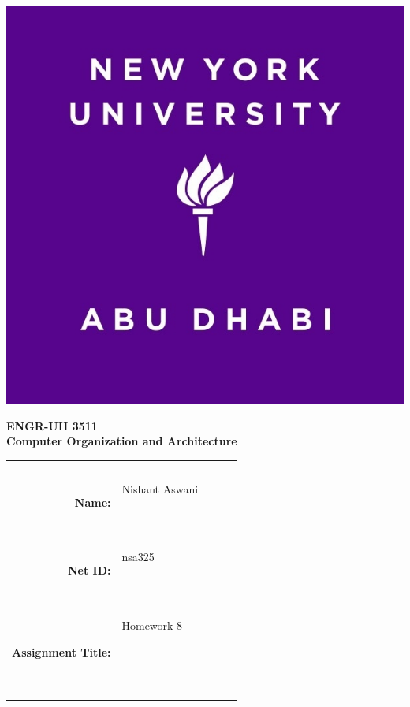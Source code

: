 \documentclass[11pt]{exam}
\newcommand{\myname}{Nishant Aswani}
\newcommand{\mynetid}{nsa325}
\newcommand{\myhwtype}{Homework}
\newcommand{\myhwnum}{8}
\newcommand{\mycoursenumber}{ENGR-UH 3511}
\newcommand{\myclassname}{Computer Organization and Architecture}
\begin{document}
\begin{center}
  \includegraphics[scale=0.15]{etc/NYUAD-alt-logo.jpg}
\end{center}

{\vspace{1.5em}}

\begin{center}
    \Huge{\textbf{\mycoursenumber}}\\
    {\vspace{0.5em}}
    \Huge{\textbf{\myclassname}}
\end{center}

{\vspace{10em}}

\begin{center}
  \begin{tabular}{|rp{5.0cm}lll|}
    \hline
    &  &  &  & \\
    &  &  &  & \\
    \Large{\textbf{Name:}} & \Large{\myname}
    
    \  &  &  & \\
    \Large{\textbf{Net ID:}} & \Large{\mynetid}
    
    \  &  &  & \\
    \Large{\textbf{Assignment Title:}} & \Large{\myhwtype{} \myhwnum}
    
    \
    
    \  &  &  & \\
    \hline
  \end{tabular}
\end{center}
\end{document}
